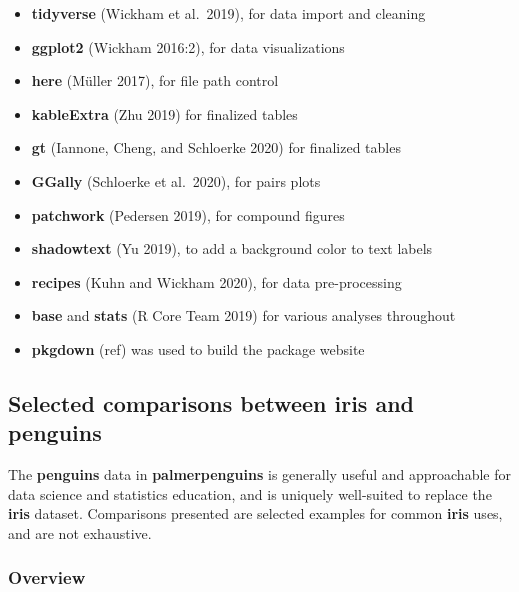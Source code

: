 \begin{itemize}
\tightlist
\item
  \textbf{tidyverse} (Wickham et al.~2019), for data import and cleaning
\item
  \textbf{ggplot2} (Wickham 2016:2), for data visualizations
\item
  \textbf{here} (Müller 2017), for file path control
\item
  \textbf{kableExtra} (Zhu 2019) for finalized tables
\item
  \textbf{gt} (Iannone, Cheng, and Schloerke 2020) for finalized tables
\item
  \textbf{GGally} (Schloerke et al.~2020), for pairs plots
\item
  \textbf{patchwork} (Pedersen 2019), for compound figures
\item
  \textbf{shadowtext} (Yu 2019), to add a background color to text
  labels
\item
  \textbf{recipes} (Kuhn and Wickham 2020), for data pre-processing
\item
  \textbf{base} and \textbf{stats} (R Core Team 2019) for various
  analyses throughout
\item
  \textbf{pkgdown} (ref) was used to build the package website
\end{itemize}

\hypertarget{selected-comparisons-between-iris-and-penguins}{%
\subsection{\texorpdfstring{Selected comparisons between \textbf{iris}
and
\textbf{penguins}}{Selected comparisons between iris and penguins}}\label{selected-comparisons-between-iris-and-penguins}}

The \textbf{penguins} data in \textbf{palmerpenguins} is generally
useful and approachable for data science and statistics education, and
is uniquely well-suited to replace the \textbf{iris} dataset.
Comparisons presented are selected examples for common \textbf{iris}
uses, and are not exhaustive.

\hypertarget{overview}{%
\subsubsection{Overview}\label{overview}}

